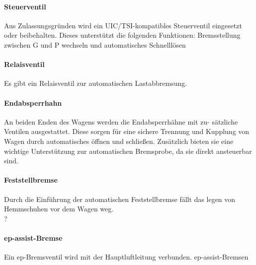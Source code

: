\paragraph{Steuerventil}\label{sec:Bremsart}
Aus Zulassungsgründen wird ein UIC/TSI-kompatibles Steuerventil eingesetzt oder beibehalten. Dieses unterstützt die folgenden Funktionen: Bremsstellung zwischen G und P wechseln und automatisches Schnelllösen

\paragraph{Relaisventil} Es gibt ein Relaisventil zur automatischen Lastabbremsung.

\paragraph{Endabsperrhahn} \label{sec:Endabsperrhahn}
An beiden Enden des Wagens werden die Endabsperrhähne mit zu- sätzliche Ventilen ausgestattet. Diese sorgen für eine sichere Trennung und Kupplung von Wagen durch automatisches öffnen und schließen. Zusätzlich bieten sie eine wichtige Unterstützung zur automatischen Bremsprobe, da sie direkt ansteuerbar sind.


\paragraph{Feststellbremse}
Durch die Einführung der automatischen Feststellbremse fällt das legen von Hemmschuhen vor dem Wagen weg. \\?

\paragraph{ep-assist-Bremse} 
Ein ep-Bremsventil wird mit der Hauptluftleitung verbunden. \gls{ep-assist-Bremsen}


